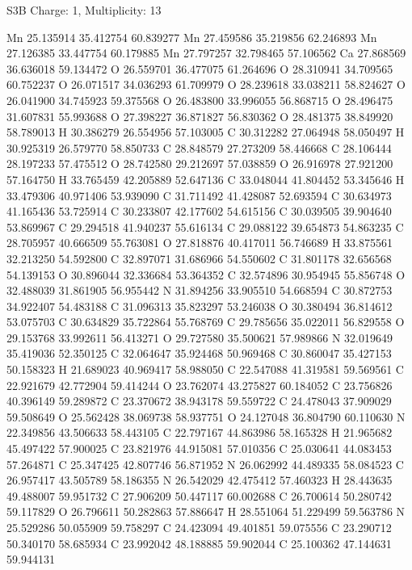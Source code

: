 \documentclass{article}
\begin{document}
S3B   Charge: 1, Multiplicity: 13     
    
Mn 25.135914 35.412754 60.839277 
Mn 27.459586 35.219856 62.246893 
Mn 27.126385 33.447754 60.179885 
Mn 27.797257 32.798465 57.106562 
Ca 27.868569 36.636018 59.134472 
O 26.559701 36.477075 61.264696 
O 28.310941 34.709565 60.752237 
O 26.071517 34.036293 61.709979 
O 28.239618 33.038211 58.824627 
O 26.041900 34.745923 59.375568 
O 26.483800 33.996055 56.868715 
O 28.496475 31.607831 55.993688 
O 27.398227 36.871827 56.830362 
O 28.481375 38.849920 58.789013 
H 30.386279 26.554956 57.103005 
C 30.312282 27.064948 58.050497 
H 30.925319 26.579770 58.850733 
C 28.848579 27.273209 58.446668 
C 28.106444 28.197233 57.475512 
O 28.742580 29.212697 57.038859 
O 26.916978 27.921200 57.164750 
H 33.765459 42.205889 52.647136 
C 33.048044 41.804452 53.345646 
H 33.479306 40.971406 53.939090 
C 31.711492 41.428087 52.693594 
C 30.634973 41.165436 53.725914 
C 30.233807 42.177602 54.615156 
C 30.039505 39.904640 53.869967 
C 29.294518 41.940237 55.616134 
C 29.088122 39.654873 54.863235 
C 28.705957 40.666509 55.763081 
O 27.818876 40.417011 56.746689 
H 33.875561 32.213250 54.592800 
C 32.897071 31.686966 54.550602 
C 31.801178 32.656568 54.139153 
O 30.896044 32.336684 53.364352 
C 32.574896 30.954945 55.856748 
O 32.488039 31.861905 56.955442 
N 31.894256 33.905510 54.668594 
C 30.872753 34.922407 54.483188 
C 31.096313 35.823297 53.246038 
O 30.380494 36.814612 53.075703 
C 30.634829 35.722864 55.768769 
C 29.785656 35.022011 56.829558 
O 29.153768 33.992611 56.413271 
O 29.727580 35.500621 57.989866 
N 32.019649 35.419036 52.350125 
C 32.064647 35.924468 50.969468 
C 30.860047 35.427153 50.158323 
H 21.689023 40.969417 58.988050 
C 22.547088 41.319581 59.569561 
C 22.921679 42.772904 59.414244 
O 23.762074 43.275827 60.184052 
C 23.756826 40.396149 59.289872 
C 23.370672 38.943178 59.559722 
C 24.478043 37.909029 59.508649 
O 25.562428 38.069738 58.937751 
O 24.127048 36.804790 60.110630 
N 22.349856 43.506633 58.443105 
C 22.797167 44.863986 58.165328 
H 21.965682 45.497422 57.900025 
C 23.821976 44.915081 57.010356 
C 25.030641 44.083453 57.264871 
C 25.347425 42.807746 56.871952 
N 26.062992 44.489335 58.084523 
C 26.957417 43.505789 58.186355 
N 26.542029 42.475412 57.460323 
H 28.443635 49.488007 59.951732 
C 27.906209 50.447117 60.002688 
C 26.700614 50.280742 59.117829 
O 26.796611 50.282863 57.886647 
H 28.551064 51.229499 59.563786 
N 25.529286 50.055909 59.758297 
C 24.423094 49.401851 59.075556 
C 23.290712 50.340170 58.685934 
C 23.992042 48.188885 59.902044 
C 25.100362 47.144631 59.944131 
\end{document}
